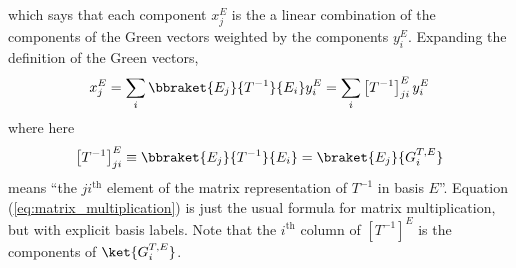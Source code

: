 which says that each component $x_j^E$ is the a linear combination of the components of the Green vectors weighted by the components $y_i^E$.
Expanding the definition of the Green vectors,
\begin{equation}
  x_j^E = \sum_i \bbraket{E_j}{T^{-1}}{E_i} y_i^E = \sum_i \left[ T^{-1} \right]^E_{ji} y^E_i \label{eq:matrix_multiplication}  %
\end{equation}
where here
\begin{equation}
  \left[ T^{-1} \right]^E_{ji} \equiv \bbraket{E_j}{T^{-1}}{E_i} = \braket{E_j}{G_i^{T,E}}
  \label{eq:matrix_elements_vs_green_vector_elements}  %
\end{equation}
means ``the $ji^\text{th}$ element of the matrix representation of $T^{-1}$ in basis $E$''.
Equation (\ref{eq:matrix_multiplication}) is just the usual formula for matrix multiplication, but with explicit basis labels.
Note that the $i^\text{th}$ column of $\left[ T^{-1} \right]^E$ is the components of $\ket{G_i^{T,E}}$.


